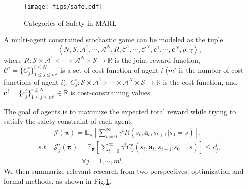 \documentclass[acmsmall]{acmart}
\begin{document}
\begin{figure}
    \centering
    \texttt{[image: figs/safe.pdf]}
    \caption{Categories of Safety in MARL}
    \label{safe}
\end{figure}

\begin{definition}
    A multi-agent constrained stochastic game can be modeled as the tuple 
    $$
        \left<N, \mathcal S, \mathcal A^1, \cdots, \mathcal{A}^N, R, \mathcal C^1, \cdots, \mathcal C^N, \bm c^1,\cdots, \bm c^N, p, \gamma\right>,
    $$
    where $R: \mathcal S \times \mathcal A^1 \times \cdots \times \mathcal A^N \times \mathcal S \rightarrow \mathbb R $ is the joint reward function, $\mathcal C^i = \{C^i_j\}^{i \le N}_{1\le j \le m^i}$ is a set of cost function of agent $i$ ($m^i$ is the number of cost functions of agent $i$), $C^i_j: \mathcal S \times \mathcal A^1\times \cdots \times \mathcal A^N \times \mathcal S \rightarrow \mathbb R $ is the cost function, and $\bm c^i = \{c^i_j\}^{i \le N}_{1\le j \le m^i} \in \mathbb R$ is cost-constraining values.
\end{definition}
The goal of agents is to maximize the expected total reward while trying to satisfy the safety constraint of each agent,
\begin{equation}   \label{safety}
\begin{aligned}
    &\mathcal J\left(\bm \pi \right) = \mathbb E_{\bm \pi}\left[\sum_{t=0}^\infty \gamma^tR\left(s_t,\bm a_t,s_{t+1}|s_0 = s\right)\right], \\
    s.t. &\mathcal J^i_j\left(\bm \pi \right) = \mathbb E_{\bm \pi}\left[\sum_{t=0}^\infty \gamma^tC^i_j\left(s_t,\bm a_t,s_{t+1}|s_0 = s\right)\right] \le c^i_j, \\
    & \qquad \qquad  \forall j = 1,\cdots, m^i.
\end{aligned} 
\end{equation}
We then summarize relevant research from two perspectives: optimization and formal methods, as shown in Fig.\ref{safe}. 
\end{document}
